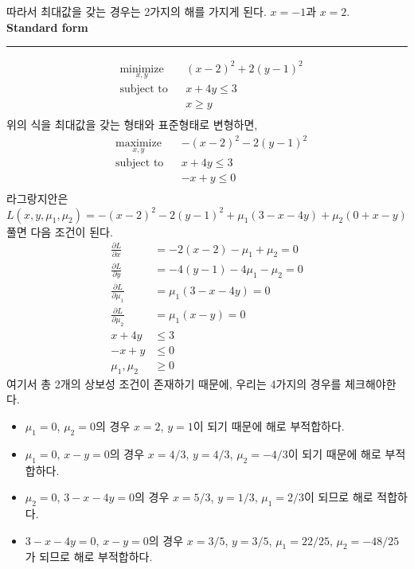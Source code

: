 따라서 최대값을 갖는 경우는 2가지의 해를 가지게 된다. $x=-1$과 $x=2$.
\\
 \textbf{Standard form}\\
\rule{\textwidth}{0.1pt}
\begin{equation*}
\begin{aligned}
& \underset{x,y}{\text{minimize}}& & (x-2)^{2}+2(y-1)^{2}\\
& \text{subject to}& & x+4y\leq 3\\
& & & x\geq y\\
\end{aligned}
\end{equation*}
위의 식을 최대값을 갖는 형태와 표준형태로 변형하면,
\begin{equation*}
\begin{aligned}
& \underset{x,y}{\text{maximize}}& & -(x-2)^{2}-2(y-1)^{2}\\
& \text{subject to}& & x+4y\leq 3\\
& & & -x+y\leq0\\
\end{aligned}
\end{equation*}
라그랑지안은
\begin{equation*}
L(x,y,\mu_{1},\mu_{2})=-(x-2)^{2}-2(y-1)^{2}+\mu_{1}(3-x-4y)+\mu_{2}(0+x-y)
\end{equation*}
풀면 다음 조건이 된다.
\begin{align*}
\frac{\partial L}{\partial x}&=-2(x-2)-\mu_{1}+\mu_{2}=0\\
\frac{\partial L}{\partial y}&=-4(y-1)-4\mu_{1}-\mu_{2}=0\\
\frac{\partial L}{\partial \mu_{1}}&=\mu_{1}(3-x-4y)=0\\
\frac{\partial L}{\partial \mu_{2}}&=\mu_{1}(x-y)=0\\
x+4y&\leq3\\
-x+y&\leq0\\
\mu_{1},\mu_{2}&\geq0
\end{align*}
여기서 총 2개의 상보성 조건이 존재하기 때문에, 우리는 4가지의 경우를 체크해야한다.
\begin{itemize}
\item $\mu_{1}=0$, $\mu_{2}=0$의 경우 $x=2$, $y=1$이 되기 때문에 해로 부적합하다.
\item $\mu_{1}=0$, $x-y=0$의 경우 $x=4/3$, $y=4/3$, $\mu_{2}=-4/3$이 되기 때문에 해로 부적합하다.
\item $\mu_{2}=0$, $3-x-4y=0$의 경우 $x=5/3$, $y=1/3$, $\mu_{1}=2/3$이 되므로 해로 적합하다.
\item $3-x-4y=0$, $x-y=0$의 경우 $x=3/5$, $y=3/5$, $\mu_{1}=22/25$, $\mu_{2}=-48/25$가 되므로 해로 부적합하다.
\end{itemize}
